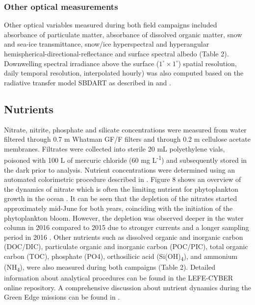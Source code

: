\documentclass[essd, manuscript]{copernicus}
\begin{document}
\subsubsection{Other optical measurements}

Other optical variables measured during both field campaigns included absorbance of particulate matter, absorbance of dissolved organic matter, snow and sea-ice transmittance, snow/ice hyperspectral and hyperangular hemispherical-directional-reflectance \citep{Goyens2018} and surface spectral albedo \citep{Verin2019} (Table 2). Downwelling spectral irradiance above the surface ($1^{\circ} \times 1^{\circ}$) spatial resolution, daily temporal resolution, interpolated hourly) was also computed based on the radiative transfer model SBDART \citep{Ricchiazzi1998} as described in \citet{Laliberte2016} and \citet{Randelhoff2019}.

\subsection{Nutrients}

Nitrate, nitrite, phosphate and silicate concentrations were measured from water filtered through 0.7 \textmu m Whatman GF/F filters and through 0.2 \textmu m cellulose acetate membranes. Filtrates were collected into sterile 20 mL polyethylene vials, poisoned with 100 \textmu L of mercuric chloride (60 mg L\textsuperscript{-1}) and subsequently stored in the dark prior to analysis. Nutrient concentrations were determined using an automated colorimetric procedure described in \citet{Aminot2007}. Figure 8 shows an overview of the dynamics of nitrate which is often the limiting nutrient for phytoplankton growth in the ocean \citep{Tremblay2009}. It can be seen that the depletion of the nitrates started approximately mid-June for both years, coinciding with the initiation of the phytoplankton bloom. However, the depletion was observed deeper in the water column in 2016 compared to 2015 due to stronger currents and a longer sampling period in 2016 \citep{Oziel2019}. Other nutrients such as dissolved organic and inorganic carbon (DOC/DIC), particulate organic and inorganic carbon (POC/PIC), total organic carbon (TOC), phosphate (PO4), orthosilicic acid (Si(OH)\textsubscript{4}), and ammonium (NH\textsubscript{4}), were also measured during both campaigns (Table 2). Detailed information about analytical procedures can be found in the LEFE-CYBER online repository. A comprehensive discussion about nutrient dynamics during the Green Edge missions can be found in \citet{Grondin2019}.
\end{document}

